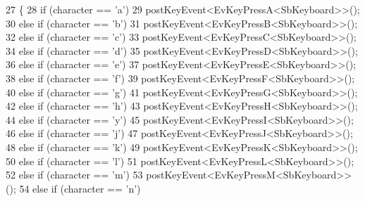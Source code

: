 \begin{DoxyCode}
27         \{
28                 \textcolor{keywordflow}{if} (character == \textcolor{charliteral}{'a'})
29                         postKeyEvent<EvKeyPressA<SbKeyboard>>();
30                 \textcolor{keywordflow}{else} \textcolor{keywordflow}{if} (character == \textcolor{charliteral}{'b'})
31                         postKeyEvent<EvKeyPressB<SbKeyboard>>();
32                 \textcolor{keywordflow}{else} \textcolor{keywordflow}{if} (character == \textcolor{charliteral}{'c'})
33                         postKeyEvent<EvKeyPressC<SbKeyboard>>();
34                 \textcolor{keywordflow}{else} \textcolor{keywordflow}{if} (character == \textcolor{charliteral}{'d'})
35                         postKeyEvent<EvKeyPressD<SbKeyboard>>();
36                 \textcolor{keywordflow}{else} \textcolor{keywordflow}{if} (character == \textcolor{charliteral}{'e'})
37                         postKeyEvent<EvKeyPressE<SbKeyboard>>();
38                 \textcolor{keywordflow}{else} \textcolor{keywordflow}{if} (character == \textcolor{charliteral}{'f'})
39                         postKeyEvent<EvKeyPressF<SbKeyboard>>();
40                 \textcolor{keywordflow}{else} \textcolor{keywordflow}{if} (character == \textcolor{charliteral}{'g'})
41                         postKeyEvent<EvKeyPressG<SbKeyboard>>();
42                 \textcolor{keywordflow}{else} \textcolor{keywordflow}{if} (character == \textcolor{charliteral}{'h'})
43                         postKeyEvent<EvKeyPressH<SbKeyboard>>();
44                 \textcolor{keywordflow}{else} \textcolor{keywordflow}{if} (character == \textcolor{charliteral}{'y'})
45                         postKeyEvent<EvKeyPressI<SbKeyboard>>();
46                 \textcolor{keywordflow}{else} \textcolor{keywordflow}{if} (character == \textcolor{charliteral}{'j'})
47                         postKeyEvent<EvKeyPressJ<SbKeyboard>>();
48                 \textcolor{keywordflow}{else} \textcolor{keywordflow}{if} (character == \textcolor{charliteral}{'k'})
49                         postKeyEvent<EvKeyPressK<SbKeyboard>>();
50                 \textcolor{keywordflow}{else} \textcolor{keywordflow}{if} (character == \textcolor{charliteral}{'l'})
51                         postKeyEvent<EvKeyPressL<SbKeyboard>>();
52                 \textcolor{keywordflow}{else} \textcolor{keywordflow}{if} (character == \textcolor{charliteral}{'m'})
53                         postKeyEvent<EvKeyPressM<SbKeyboard>>();
54                 \textcolor{keywordflow}{else} \textcolor{keywordflow}{if} (character == \textcolor{charliteral}{'n'})

\end{DoxyCode}
